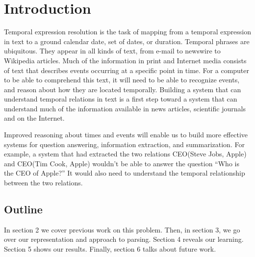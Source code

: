 \section{Introduction}
\label{sec:introduction}

Temporal expression resolution is the task of mapping from a temporal expression in text to a ground calendar date, set of dates, or duration. Temporal phrases are ubiquitous. They appear in all kinds of text, from e-mail to newswire to Wikipedia articles. 
Much of the information in print and Internet media consists of text that describes events occurring at a specific point in time. For a computer to be able to comprehend this text, it will need to be able to recognize events, and reason about how they are located temporally. Building a system that can understand temporal relations in text is a first step toward a system that can understand much of the information available in news articles, scientific journals and on the Internet.

Improved reasoning about times and events will enable us to build more effective systems for question answering, information extraction, and summarization. For example, a system that had extracted the two relations CEO(Steve Jobs, Apple) and CEO(Tim Cook, Apple) wouldn’t be able to answer the question “Who is the CEO of Apple?” It would also need to understand the temporal relationship between the two relations.



\subsection{Outline}
In section 2 we cover previous work on this problem. Then, in section 3, we go over our representation and approach to parsing. Section 4 reveals our learning. Section 5 shows our results. Finally, section 6 talks about future work.


